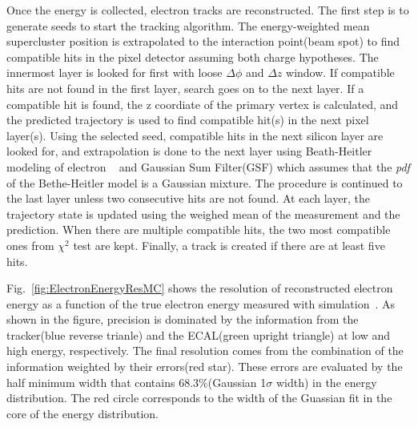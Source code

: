 Once the energy is collected, electron tracks are reconstructed. The first step is 
to generate seeds to start the tracking algorithm. The energy-weighted mean 
supercluster position is extrapolated to the interaction point(beam spot) 
to find compatible hits in the pixel detector assuming both charge hypotheses. 
The innermost layer is looked for first with loose $\Delta\phi$ and $\Delta z$ window. 
If compatible hits are not found in the first layer, search goes on to the next layer. 
If a compatible hit is found, the z coordiate of the primary vertex is calculated,
and the predicted trajectory is used to find compatible hit(s) in the next pixel layer(s).  
Using the selected seed, compatible hits in the next silicon layer are looked for,  
and extrapolation is done to the next layer using Beath-Heitler modeling of electron 
\brem~\cite{BetheHeitler} 
and Gaussian Sum Filter(GSF) \cite{0954-3899-31-9-N01} which assumes that the \textit{pdf} 
of the Bethe-Heitler model is a Gaussian mixture. 
The procedure is continued to the last layer unless two consecutive hits are not found. 
At each layer, the trajectory state is updated using the weighed mean of the measurement 
and the prediction. When there are multiple compatible hits, the two most compatible ones 
from $\chi^2$ test are kept. Finally, a track is created if there are at least five hits. 

Fig.~\ref{fig:ElectronEnergyResMC} shows the resolution of reconstructed electron energy 
as a function of the true electron energy measured with simulation~\cite{PAS-HIG-13-002}.   
As shown in the figure, precision is dominated by the information 
from the tracker(blue reverse trianle) and the ECAL(green upright triangle) 
at low and high energy, respectively. 
The final resolution comes from the combination of the information weighted by 
their errors(red star). These errors are evaluated by the half minimum width that 
contains 68.3\%(Gaussian 1$\sigma$ width) in the energy distribution. 
The red circle corresponds to the width of the Guassian fit in the core of the 
energy distribution. 


